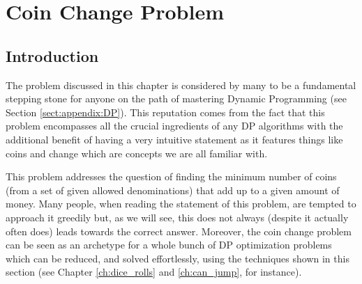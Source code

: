 %

\chapter{Coin Change Problem}
\label{ch:coin_change}
\section*{Introduction}
The problem discussed in this chapter is considered by many to be a fundamental stepping stone for anyone on the path of mastering Dynamic Programming (see Section \ref{sect:appendix:DP}).
This reputation comes from the fact that this problem encompasses all the crucial ingredients of any DP algorithms with the additional benefit of having a very intuitive statement as 
it features things like coins and change which are concepts we are all familiar with.

This problem addresses the question of finding the minimum number of coins (from a set of given allowed denominations) that add up to a given amount of money. 
Many people, when reading the statement of this problem, are tempted to approach it greedily but, as we will see, this does not always (despite it actually often does) leads towards the correct answer. 
Moreover, the coin change problem can be seen as an archetype for a whole bunch of DP optimization problems which can be reduced, and solved effortlessly, using the techniques shown in this section (see Chapter \ref{ch:dice_rolls} and \ref{ch:can_jump}, for instance).


